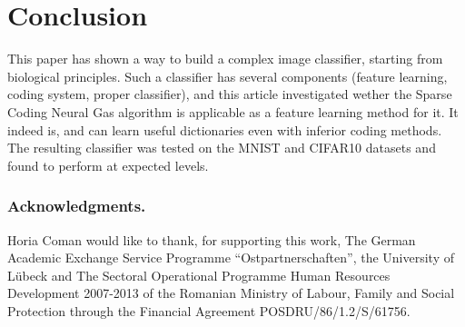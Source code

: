 \documentclass[runningheads,a4paper]{llncs}
\begin{document}
\section{Conclusion}

This paper has shown a way to build a complex image classifier, starting from biological principles. Such a classifier has several components (feature learning, coding system, proper classifier), and this article investigated wether the Sparse Coding Neural Gas algorithm is applicable as a feature learning method for it. It indeed is, and can learn useful dictionaries even with inferior coding methods. The resulting classifier was tested on the MNIST and CIFAR10 datasets and found to perform at expected levels.

\subsubsection*{Acknowledgments.} Horia Coman would like to thank, for supporting this work, The German Academic Exchange Service Programme ``Ostpartnerschaften'', the University of L\"{u}beck  and The Sectoral Operational Programme Human Resources Development 2007-2013 of the Romanian Ministry of Labour, Family and Social Protection through the Financial Agreement POSDRU/86/1.2/S/61756.



\end{document}
